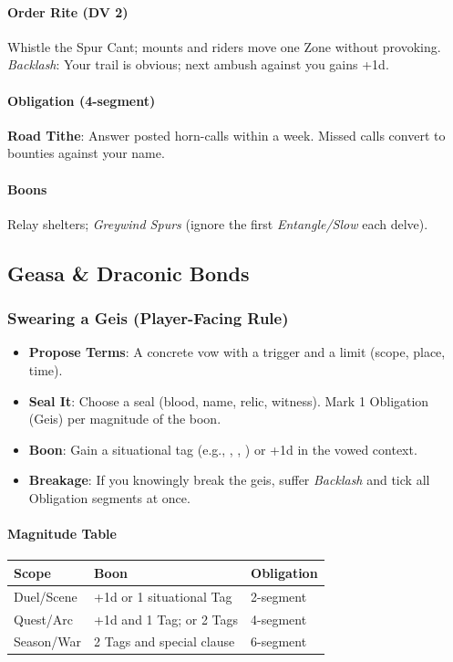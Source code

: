 \documentclass[11pt,letterpaper]{article}
\begin{document}
\paragraph{Order Rite (DV 2)}  
Whistle the Spur Cant; mounts and riders move one Zone without provoking. \textit{Backlash}: Your trail is obvious; next ambush against you gains +1d.

\paragraph{Obligation (4-segment)}
\textbf{Road Tithe}: Answer posted horn-calls within a week. Missed calls convert to bounties against your name.

\paragraph{Boons}
Relay shelters; \textit{Greywind Spurs} (ignore the first \textit{Entangle/Slow} each delve).

\subsection{Geasa \& Draconic Bonds}

\subsubsection{Swearing a Geis (Player-Facing Rule)}
\begin{itemize}[leftmargin=*]
\item \textbf{Propose Terms}: A concrete vow with a trigger and a limit (scope, place, time).
\item \textbf{Seal It}: Choose a seal (blood, name, relic, witness). Mark 1 Obligation (Geis) per magnitude of the boon.
\item \textbf{Boon}: Gain a situational tag (e.g., , , ) or +1d in the vowed context.
\item \textbf{Breakage}: If you knowingly break the geis, suffer \textit{Backlash} and tick all Obligation segments at once.
\end{itemize}

\paragraph{Magnitude Table}
\begin{longtable}{@{}lll@{}}
\toprule
\textbf{Scope} & \textbf{Boon} & \textbf{Obligation}\\
\midrule
Duel/Scene & +1d or 1 situational Tag & 2-segment \\
Quest/Arc & +1d and 1 Tag; or 2 Tags & 4-segment \\
Season/War & 2 Tags and special clause & 6-segment \\
\bottomrule
\end{longtable}
\end{document}
